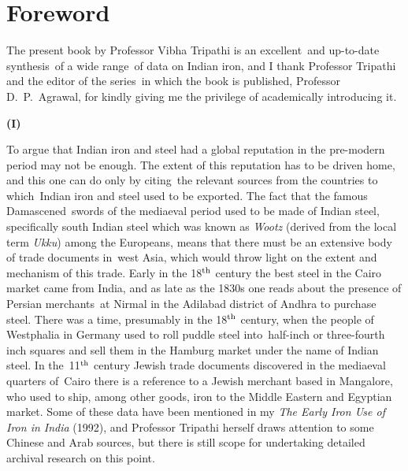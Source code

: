 \chapter*{Foreword}\label{preface}


The present book by Professor Vibha Tripathi is an excellent and up-to-date synthesis of a wide range of data on Indian iron, and I thank Professor Tripathi and the editor of the series in which the book is published, Professor D.~P.~Agrawal, for kindly giving me the privilege of academically introducing it.

\vspace{-.3cm}

\begin{center}{\textbf{(I)}}\end{center}

\vspace{-.3cm}

To argue that Indian iron and steel had a global reputation in the pre-modern period may not be enough. The extent of this reputation has to be driven home, and this one can do only by citing the relevant sources from the countries to which Indian iron and steel used to be exported. The fact that the famous Damascened swords of the mediaeval period used to be made of Indian steel, specifically south Indian steel which was known as \textit{Wootz} (derived from the local term \textit{Ukku}) among the Europeans, means that there must be an extensive body of trade documents in west Asia, which would throw light on the extent and mechanism of this trade. Early in the 18$^{\rm th}$ century the best steel in the Cairo market came from India, and as late as the 1830s one reads about the presence of Persian merchants at Nirmal in the Adilabad district of Andhra to purchase steel. There was a time, presumably in the 18$^{\rm th}$ century, when the people of Westphalia in Germany used to roll puddle steel into half-inch or three-fourth inch squares and sell them in the Hamburg market under the name of Indian steel. In the 11$^{\rm th}$ century Jewish trade documents discovered in the mediaeval quarters of Cairo there is a reference to a Jewish merchant based in Mangalore, who used to ship, among other goods, iron to the Middle Eastern and Egyptian market. Some of these data have been mentioned in my \textit{The Early Iron Use of Iron in India} (1992), and Professor Tripathi herself draws attention to some Chinese and Arab sources, but there is still scope for undertaking detailed archival research on this point. 

